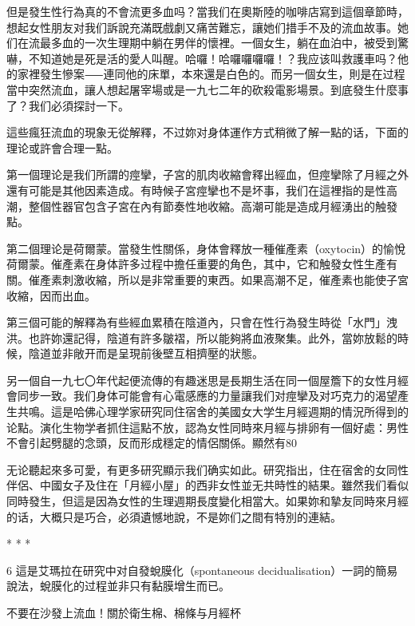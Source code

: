 \documentclass[12pt,UTF8]{ctexbook}
\begin{document}
但是發生性行為真的不會流更多血吗？當我们在奧斯陸的咖啡店寫到這個章節時，想起女性朋友对我们訴說充滿既戲劇又痛苦難忘，讓她们措手不及的流血故事。她们在流最多血的一次生理期中躺在男伴的懷裡。一個女生，躺在血泊中，被受到驚嚇，不知道她是死是活的愛人叫醒。哈囉！哈囉囉囉囉！？我应该叫救護車吗？他的家裡發生慘案⸺連同他的床單，本來還是白色的。而另一個女生，則是在过程當中突然流血，讓人想起屠宰場或是一九七二年的砍殺電影場景。到底發生什麼事了？我们必須探討一下。

這些瘋狂流血的現象无從解釋，不过妳对身体運作方式稍微了解一點的话，下面的理论或許會合理一點。

第一個理论是我们所謂的痙攣，子宮的肌肉收縮會釋出經血，但痙攣除了月經之外還有可能是其他因素造成。有時候子宮痙攣也不是坏事，我们在這裡指的是性高潮，整個性器官包含子宮在內有節奏性地收縮。高潮可能是造成月經湧出的触發點。

第二個理论是荷爾蒙。當發生性關係，身体會釋放一種催產素（oxytocin）的愉悅荷爾蒙。催產素在身体許多过程中擔任重要的角色，其中，它和触發女性生產有關。催產素刺激收縮，所以是非常重要的東西。如果高潮不足，催產素也能使子宮收縮，因而出血。

第三個可能的解釋為有些經血累積在陰道內，只會在性行為發生時從「水門」洩洪。也許妳還記得，陰道有許多皺褶，所以能夠將血液聚集。此外，當妳放鬆的時候，陰道並非敞开而是呈現前後壁互相擠壓的狀態。

另一個自一九七〇年代起便流傳的有趣迷思是長期生活在同一個屋簷下的女性月經會同步一致。我们身体可能會有心電感應的力量讓我们对痙攣及对巧克力的渴望產生共鳴。這是哈佛心理学家研究同住宿舍的美國女大学生月經週期的情況所得到的论點。演化生物学者抓住這點不放，認為女性同時來月經与排卵有一個好處：男性不會引起劈腿的念頭，反而形成穩定的情侶關係。顯然有80%

无论聽起來多可愛，有更多研究顯示我们确实如此。研究指出，住在宿舍的女同性伴侶、中國女子及住在「月經小屋」的西非女性並无共時性的結果。雖然我们看似同時發生，但這是因為女性的生理週期長度變化相當大。如果妳和摯友同時來月經的话，大概只是巧合，必須遺憾地說，不是妳们之間有特別的連結。





* * *



6	這是艾瑪拉在研究中对自發蛻膜化（spontaneous decidualisation）一詞的簡易說法，蛻膜化的过程並非只有黏膜增生而已。





不要在沙發上流血！關於衛生棉、棉條与月經杯
\end{document}
